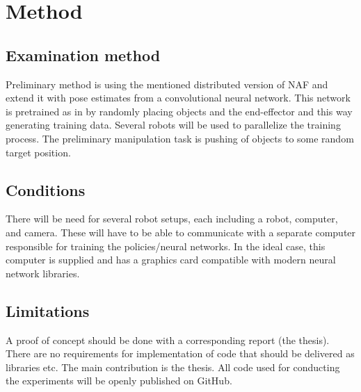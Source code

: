 \section{Method}

\subsection{Examination method}

Preliminary method is using the mentioned distributed version of NAF and extend
it with pose estimates from a convolutional neural network. This network is
pretrained as in \cite{yahya2016collective} by randomly placing objects and the
end-effector and this way generating training data. Several robots will be used
to parallelize the training process. The preliminary manipulation task is pushing
of objects to some random target position.

\subsection{Conditions}

There will be need for several robot setups, each including a robot,
computer, and camera. These will have to be able to communicate with a separate
computer responsible for training the policies/neural networks. In the ideal
case, this computer is supplied and has a graphics card compatible with modern
neural network libraries.

\subsection{Limitations}

A proof of concept should be done with a corresponding report (the thesis).
There are no requirements for implementation of code that should be delivered
as libraries etc. The main contribution is the thesis. All code used for
conducting the experiments will be openly published on GitHub.
